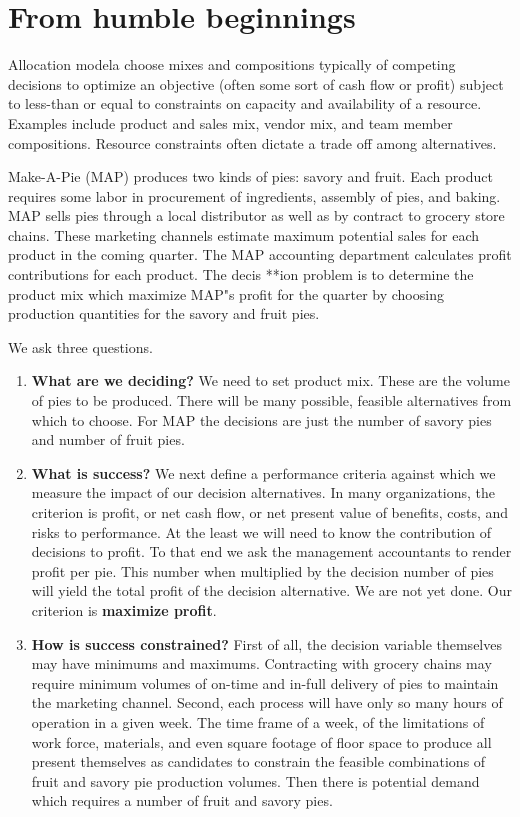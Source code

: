 \documentclass[
]{book}
\begin{document}
\hypertarget{from-humble-beginnings}{%
\section{From humble beginnings}\label{from-humble-beginnings}}

Allocation modela choose mixes and compositions typically of competing decisions to optimize an objective (often some sort of cash flow or profit) subject to less-than or equal to constraints on capacity and availability of a resource. Examples include product and sales mix, vendor mix, and team member compositions. Resource constraints often dictate a trade off among alternatives.

Make-A-Pie (MAP) produces two kinds of pies: savory and fruit. Each product requires some labor in procurement of ingredients, assembly of pies, and baking. MAP sells pies through a local distributor as well as by contract to grocery store chains. These marketing channels estimate maximum potential sales for each product in the coming quarter. The MAP accounting department calculates profit contributions for each product. The decis **ion problem is to determine the product mix which maximize MAP"s profit for the quarter by choosing production quantities for the savory and fruit pies.

We ask three questions.

\begin{enumerate}
\def\labelenumi{\arabic{enumi}.}
\item
  \textbf{What are we deciding?} We need to set product mix. These are the volume of pies to be produced. There will be many possible, feasible alternatives from which to choose. For MAP the decisions are just the number of savory pies and number of fruit pies.
\item
  \textbf{What is success?} We next define a performance criteria against which we measure the impact of our decision alternatives. In many organizations, the criterion is profit, or net cash flow, or net present value of benefits, costs, and risks to performance. At the least we will need to know the contribution of decisions to profit. To that end we ask the management accountants to render profit per pie. This number when multiplied by the decision number of pies will yield the total profit of the decision alternative. We are not yet done. Our criterion is \textbf{maximize profit}.
\item
  \textbf{How is success constrained?} First of all, the decision variable themselves may have minimums and maximums. Contracting with grocery chains may require minimum volumes of on-time and in-full delivery of pies to maintain the marketing channel. Second, each process will have only so many hours of operation in a given week. The time frame of a week, of the limitations of work force, materials, and even square footage of floor space to produce all present themselves as candidates to constrain the feasible combinations of fruit and savory pie production volumes. Then there is potential demand which requires a number of fruit and savory pies.
\end{enumerate}
\end{document}

